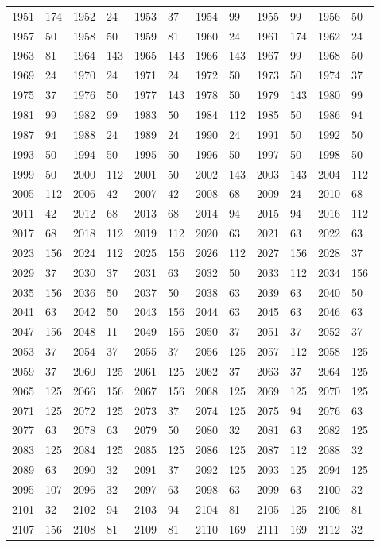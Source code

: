 \begin{longtable}{llllllllllll}
1951 & 174&1952 &24&1953& 37&1954 &99&1955 &99&1956& 50\\
1957 & 50&1958 &50&1959& 81&1960 &24&1961 &174&1962& 24\\
1963 & 81&1964 &143&1965& 143&1966 &143&1967 &99&1968& 50\\
1969 & 24&1970 &24&1971& 24&1972 &50&1973 &50&1974& 37\\
1975 & 37&1976 &50&1977& 143&1978 &50&1979 &143&1980& 99\\
1981 & 99&1982 &99&1983& 50&1984 &112&1985 &50&1986& 94\\
1987 & 94&1988 &24&1989& 24&1990 &24&1991 &50&1992& 50\\
1993 & 50&1994 &50&1995& 50&1996 &50&1997 &50&1998& 50\\
1999 & 50&2000 &112&2001& 50&2002 &143&2003 &143&2004& 112\\
2005 & 112&2006 &42&2007& 42&2008 &68&2009 &24&2010& 68\\
2011 & 42&2012 &68&2013& 68&2014 &94&2015 &94&2016& 112\\
2017 & 68&2018 &112&2019& 112&2020 &63&2021 &63&2022& 63\\
2023 & 156&2024 &112&2025& 156&2026 &112&2027 &156&2028& 37\\
2029 & 37&2030 &37&2031& 63&2032 &50&2033 &112&2034& 156\\
2035 & 156&2036 &50&2037& 50&2038 &63&2039 &63&2040& 50\\
2041 & 63&2042 &50&2043& 156&2044 &63&2045 &63&2046& 63\\
2047 & 156&2048 &11&2049& 156&2050 &37&2051 &37&2052& 37\\
2053 & 37&2054 &37&2055& 37&2056 &125&2057 &112&2058& 125\\
2059 & 37&2060 &125&2061& 125&2062 &37&2063 &37&2064& 125\\
2065 & 125&2066 &156&2067& 156&2068 &125&2069 &125&2070& 125\\
2071 & 125&2072 &125&2073& 37&2074 &125&2075 &94&2076& 63\\
2077 & 63&2078 &63&2079& 50&2080 &32&2081 &63&2082& 125\\
2083 & 125&2084 &125&2085& 125&2086 &125&2087 &112&2088& 32\\
2089 & 63&2090 &32&2091& 37&2092 &125&2093 &125&2094& 125\\
2095 & 107&2096 &32&2097& 63&2098 &63&2099 &63&2100& 32\\
2101 & 32&2102 &94&2103& 94&2104 &81&2105 &125&2106& 81\\
2107 & 156&2108 &81&2109& 81&2110 &169&2111 &169&2112& 32\\

\end{longtable}

